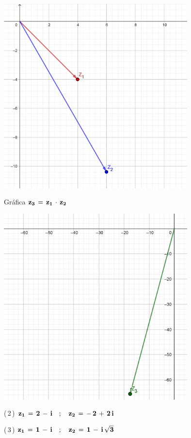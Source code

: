 \documentclass[a4paper,11pt,openany]{book}
\begin{document}
\begin{center}
    \includegraphics[width=10cm]{Gra-Ej-1-1.png}
\end{center}

\newpage

\textcolor{ao(english)}{} Gráfica $\bf{z_{3}\,=\,z_{1}\,\cdot\,z_{2}}$

\begin{center}
    \includegraphics[width=10cm]{Gra-Ej-1-2.png}
\end{center}

\textcolor{ao(english)}{(\,2\,)} $\bf{z_{1}\,=\,2\,-\,i \quad;\quad z_{2}\,=\,-\,2\,+\,2\,i}$

\textcolor{ao(english)}{(\,3\,)} $\bf{z_{1}\,=\,1\,-\,i \quad;\quad z_{2}\,=\,1\,-\,i\,\sqrt{3}}$\\
\end{document}

